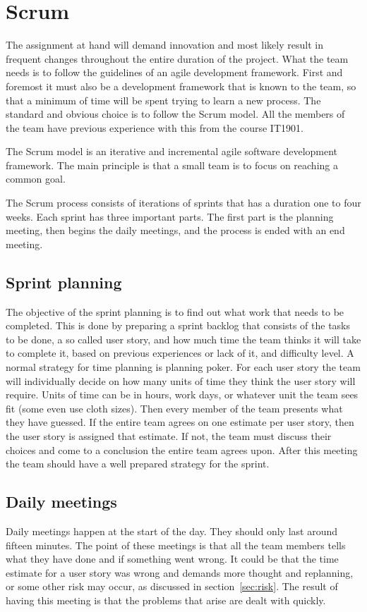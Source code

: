 \section{Scrum}

The assignment at hand will demand innovation and most likely result in frequent changes throughout the entire duration of the project.
What the team needs is to follow the guidelines of an agile development framework. First and foremost it must also be a development framework that is known to the team,
so that a minimum of time will be spent trying to learn a new process.
The standard and obvious choice is to follow the Scrum model. All the members of the team have previous experience with this from the course IT1901.

The Scrum model is an iterative and incremental agile software development framework.
The main principle is that a small team is to focus on reaching a common goal.

The Scrum process consists of iterations of sprints that has a duration one to four weeks. Each sprint has three important parts.
The first part is the planning meeting, then begins the daily  meetings, and the process is ended with an end meeting.

\subsection{Sprint planning}
The objective of the sprint planning is to find out what work that needs to be completed. This is done by preparing a
sprint backlog that consists of the tasks to be done, a so called user story, and how much time the team thinks it 
will take to complete it, based on previous experiences or lack of it, and difficulty level. A normal strategy for time planning is planning poker. 
For each user story the team will individually decide on how many units of time they think the user story will require. 
Units of time can be in hours, work days, or whatever unit the team sees fit (some even use cloth sizes).
Then every member of the team presents what they have guessed. If the entire team agrees on one estimate per user story,
then the user story is assigned that estimate. If not, the team must discuss their choices and come to a conclusion 
the entire team agrees upon.
After this meeting the team should have a well prepared strategy for the sprint.

\subsection{Daily meetings}
Daily meetings happen at the start of the day. They should only last around fifteen minutes. 
The point of these meetings is that all the team members tells what they have done and if something went wrong.
It could be that the time estimate for a user story was wrong and demands more thought and replanning, 
or some other risk may occur, as discussed in section~\ref{sec:risk}. 
The result of having this meeting is that the problems that arise are dealt with quickly.

